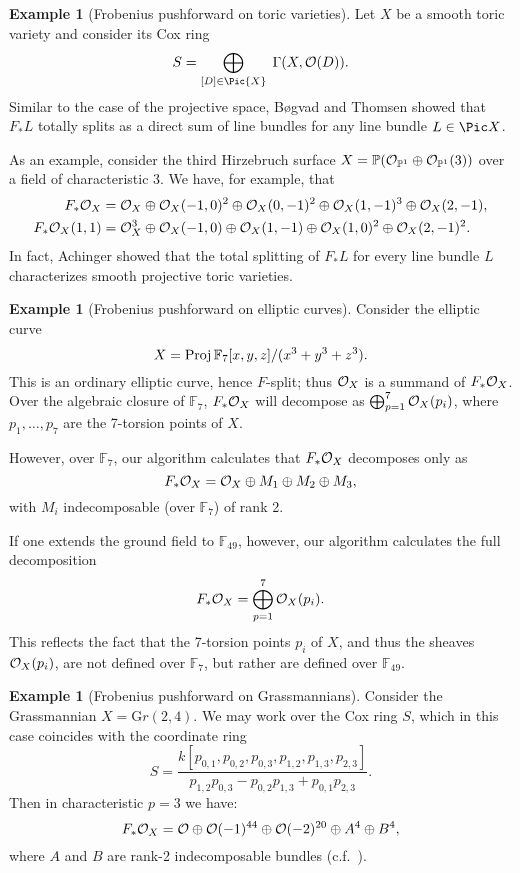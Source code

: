\documentclass[12pt]{article}
\def\Gr{\mathrm Gr}
\theoremstyle{theorem}
\numberwithin{thm}{section}
\theoremstyle{definition}
\newtheorem{exa}[thm]{Example}
\begin{document}
\begin{exa}[Frobenius pushforward on toric varieties]
  Let $X$ be a smooth toric variety and consider its Cox ring
  \[ S = \bigoplus_{[D]\in\Pic{X}} \; \Gamma(X, \O(D)). \]
  Similar to the case of the projective space, B{\o}gvad and Thomsen \cite{Bogvad98,Thomsen00} showed that $F_*L$ totally splits as a direct sum of line bundles for any line bundle $L\in\Pic X$.

  As an example, consider the third Hirzebruch surface $X=\mathbb P(\mathcal O_{\mathbb P^1}\oplus \mathcal O_{\mathbb P^1}(3))$ over a field of characteristic 3. We have, for example, that
  \begin{align*}
    F_*\mathcal O_X      &= \mathcal O_X   \oplus \mathcal O_X(-1,0)^2 \oplus \mathcal O_X(0,-1)^2 \oplus \mathcal O_X(1,-1)^3 \oplus \mathcal O_X(2,-1), \\
    F_*\mathcal O_X(1,1) &= \mathcal O_X^3 \oplus \mathcal O_X(-1,0)   \oplus \mathcal O_X(1,-1)   \oplus \mathcal O_X(1, 0)^2 \oplus \mathcal O_X(2,-1)^2.
  \end{align*}
  In fact, Achinger \cite{Achinger15} showed that the total splitting of $F_*L$ for every line bundle $L$ characterizes smooth projective toric varieties.
\end{exa}

\begin{exa}[Frobenius pushforward on elliptic curves]\label{algclos}
  Consider the elliptic curve
  \[ X = \operatorname{Proj} \mathbb F_7[x,y,z]/(x^3+y^3+z^3). \]
  This is an ordinary elliptic curve, hence $F$-split; thus $\mathcal O_X$ is a summand of $F_* \mathcal O_X$. Over the algebraic closure of $\mathbb F_7$, $F_*\mathcal O_X$ will decompose as $\bigoplus_{p=1}^7 \mathcal O_X(p_i)$, where $p_1,\dots,p_7$ are the 7-torsion points of $X$.

  However, over $\mathbb F_7$, our algorithm calculates that $F_*\mathcal O_X$ decomposes only as
  $$ F_* \mathcal O_X =\mathcal O_X \oplus M_1\oplus M_2\oplus M_3, $$
  with $M_i$ indecomposable (over $\mathbb F_7$) of rank 2.

  If one extends the ground field to $\mathbb F_{49}$, however, our algorithm calculates the full decomposition
  $$ F_* \mathcal O_X=\bigoplus_{p=1}^7 \mathcal O_X(p_i). $$
  This reflects the fact that the 7-torsion points $p_i$ of $X$, and thus the sheaves $\mathcal O_X(p_i)$, are not defined over $\mathbb F_7$, but rather are defined over $\mathbb F_{49}$.
\end{exa}

\begin{exa}[Frobenius pushforward on Grassmannians]
  Consider the Grassmannian $X = \Gr(2,4)$. We may work over the Cox ring $S$,
  which in this case coincides with the coordinate ring
  \[ S = \frac{k[p_{0,1},p_{0,2},p_{0,3},p_{1,2},p_{1,3},p_{2,3}]}{p_{1,2}p_{0,3}-p_{0,2}p_{1,3}+p_{0,1}p_{2,3}}. \]
  Then in characteristic $p=3$ we have:
  \[ F_*\mathcal O_X = \mathcal O \oplus \mathcal O(-1)^{44} \oplus \mathcal O(-2)^{20} \oplus A^4 \oplus B^4, \]
  where $A$ and $B$ are rank-2 indecomposable bundles (c.f.~\cite{RSVdB22}).
\end{exa}
\end{document}
